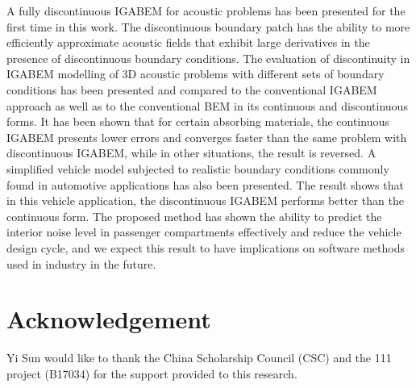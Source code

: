 \documentclass[review]{elsarticle}
\begin{document}
A fully discontinuous IGABEM for acoustic problems has been presented for the first time in this work. The discontinuous boundary patch has the ability to more efficiently approximate acoustic fields that exhibit large derivatives in the presence of discontinuous boundary conditions. The evaluation of discontinuity in IGABEM modelling of 3D acoustic problems with different sets of boundary conditions has been presented and compared to the conventional IGABEM approach as well as to the conventional BEM in its continuous and discontinuous forms. It has been shown that for certain absorbing materials, the continuous IGABEM presents lower errors and converges faster than the same problem with discontinuous IGABEM, while in other situations, the result is reversed. A simplified vehicle model subjected to realistic boundary conditions commonly found in automotive applications has also been presented. The result shows that in this vehicle application, the discontinuous IGABEM performs better than the continuous form. The proposed method has shown the ability to predict the interior noise level in passenger compartments effectively and reduce the vehicle design cycle, and we expect this result to have implications on software methods used in industry in the future.


\section*{Acknowledgement}

Yi Sun would like to thank the China Scholarship Council (CSC) and the 111 project (B17034) for the support provided to this research. 



%
\end{document}
